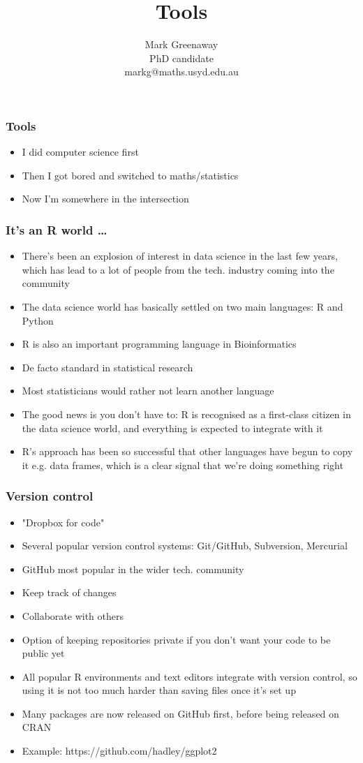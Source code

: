 \documentclass{beamer}
\title{Tools}
\author{Mark Greenaway\\PhD candidate\\markg@maths.usyd.edu.au}
\begin{document}
\begin{frame}
\titlepage
\end{frame}

\begin{frame}
\frametitle{Tools}
\begin{itemize}
\item I did computer science first
\item Then I got bored and switched to maths/statistics
\item Now I'm somewhere in the intersection
\end{itemize}
\end{frame}

\begin{frame}
\frametitle{It's an R world \ldots}
\begin{itemize}
\item There's been an explosion of interest in data science in the last few years, which has 
			lead to a lot of people from the tech. industry coming into the community
\item The data science world has basically settled on two main languages: R and Python
\item R is also an important programming language in Bioinformatics
\item De facto standard in statistical research
\item Most statisticians would rather not learn another language
\item The good news is you don't have to: R is recognised as a first-class citizen in the data
			science world, and everything is expected to integrate with it
\item R's approach has been so successful that other languages have begun to copy it e.g. 					data frames, which is a clear signal that we're doing something right
\end{itemize}
\end{frame}

\begin{frame}
\frametitle{Version control}
\begin{itemize}
\item "Dropbox for code"
\item Several popular version control systems: Git/GitHub, Subversion, Mercurial
\item GitHub most popular in the wider tech. community
\item Keep track of changes
\item Collaborate with others
\item Option of keeping repositories private if you don't want your code to be public yet
\item All popular R environments and text editors integrate with version control, so using it
			is not too much harder than saving files once it's set up
\item Many packages are now released on GitHub first, before being released on CRAN
\item Example: https://github.com/hadley/ggplot2
\end{itemize}
\end{frame}
\end{document}
